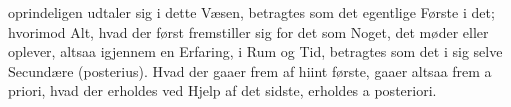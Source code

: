 \documentclass[12pt]{book}
\def\textit#1{#1}%
\begin{document}
oprindeligen udtaler sig i dette Væsen, betragtes som det egentlige Første i det;
hvorimod Alt, hvad der først fremstiller sig for det som Noget, det møder eller
oplever, altsaa igjennem en Erfaring, i Rum og Tid, betragtes som det i sig selve
Secundære (\textit{posterius}). Hvad der gaaer frem af hiint første, gaaer altsaa frem
\textit{a priori}, hvad der erholdes ved Hjelp af det sidste, erholdes
\textit{a posteriori}.
\end{document}
